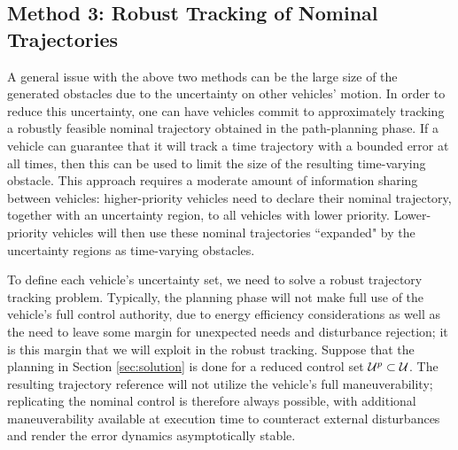 \subsection{Method 3: Robust Tracking of Nominal Trajectories}
A general issue with the above two methods can be the large size of the generated obstacles due to the uncertainty on other vehicles' motion. In order to reduce this uncertainty, one can have vehicles commit to approximately tracking a robustly feasible nominal trajectory obtained in the path-planning phase. If a vehicle can guarantee that it will track a time trajectory with a bounded error at all times, then this can be used to limit the size of the resulting time-varying obstacle. This approach requires a moderate amount of information sharing between vehicles: higher-priority vehicles need to declare their nominal trajectory, together with an uncertainty region, to all vehicles with lower priority. Lower-priority vehicles will then use these nominal trajectories ``expanded" by the uncertainty regions as time-varying obstacles.

To define each vehicle's uncertainty set, we need to solve a robust trajectory tracking problem.
Typically, the planning phase will not make full use of the vehicle's full control authority, due to energy efficiency considerations as well as the need to leave some margin for unexpected needs and disturbance rejection; it is this margin that we will exploit in the robust tracking. Suppose that the planning in Section \ref{sec:solution} is done for a reduced control set $\mathcal{U}^p\subset\mathcal{U}$. The resulting trajectory reference will not utilize the vehicle's full maneuverability; replicating the nominal control is therefore always possible, with additional maneuverability available at execution time to counteract external disturbances and render the error dynamics asymptotically stable.

